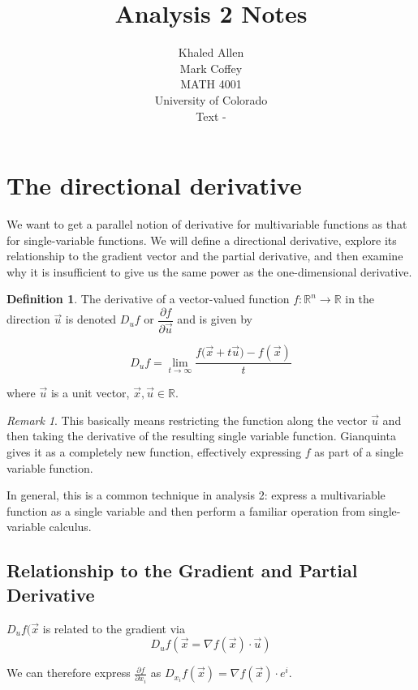 \documentclass[12pt]{article}
\newcommand{\R}{\mathbb{R}}
\theoremstyle{definition}
\newtheorem{definition}{Definition}[section]
\theoremstyle{remark}
\newtheorem*{remark}{Remark}
\begin{document}
\date{}

 
\title{Analysis 2 Notes}
\author{Khaled Allen\\Mark Coffey \\
MATH 4001\\University of Colorado\\ Text - } 
 
\maketitle
\section{The directional derivative}
We want to get a parallel notion of derivative for multivariable functions as that for single-variable functions. We will define a directional derivative, explore its relationship to the gradient vector and the partial derivative, and then examine why it is insufficient to give us the same power as the one-dimensional derivative.
\begin{definition}
The derivative of a vector-valued function $f:\R^n\to\R$ in the direction $\vec{u}$ is denoted $D_u f$ or $\dfrac{\partial f}{\partial \vec{u}}$ and is given by

$$D_u f=\lim_{t\to\infty}\frac{f(\vec{x}+t{\vec{u})}-f(\vec{x})}{t}$$

where $\vec{u}$ is a unit vector, $\vec{x},\vec{u}\in\R$.
\end{definition} 

\begin{remark}
This basically means restricting the function along the vector $\vec{u}$ and then taking the derivative of the resulting single variable function. Gianquinta gives it as a completely new function, effectively expressing $f$ as part of a single variable function.

In general, this is a common technique in analysis 2: express a multivariable function as a single variable and then perform a familiar operation from single-variable calculus.
\end{remark}

\subsection{Relationship to the Gradient and Partial Derivative}
$D_u f(\vec{x}$ is related to the gradient via
$$D_u f(\vec{x}=\nabla f(\vec{x})\cdot \vec{u})$$

We can therefore express $\frac{\partial f}{\partial x_i}$ as $D_{x_i}f(\vec{x})=\nabla f(\vec{x})\cdot e^i$.
\end{document}
